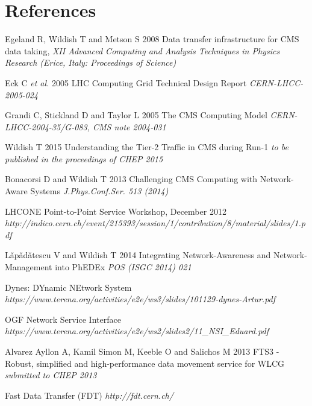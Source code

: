 \section*{References}

\begin{thebibliography}{1}

  Egeland R, Wildish T and Metson S 2008 Data transfer infrastructure for CMS data taking,  {\it XII Advanced Computing and Analysis Techniques in Physics Research (Erice, Italy: Proceedings of Science)}

 Eck C {\it et al.} 2005 LHC Computing Grid Technical Design Report {\it CERN-LHCC-2005-024}

  Grandi C, Stickland D and Taylor L 2005 The CMS Computing Model {\it CERN-LHCC-2004-35/G-083, CMS note 2004-031}

 Wildish T 2015 Understanding the Tier-2 Traffic in CMS during Run-1 {\it to be published in the proceedings of CHEP 2015}

 Bonacorsi D and Wildish T 2013 Challenging CMS Computing with Network-Aware Systems {\it J.Phys.Conf.Ser. 513 (2014)}

 LHCONE Point-to-Point Service Workshop, December 2012 
 {\it http://indico.cern.ch/event/215393/session/1/contribution/8/material/slides/1.pdf}

 L\v{a}p\v{a}d\v{a}tescu V and Wildish T 2014 Integrating Network-Awareness and Network-Management into PhEDEx {\it POS (ISGC 2014) 021}

 Dynes: DYnamic NEtwork System {\it https://www.terena.org/activities/e2e/ws3/slides/101129-dynes-Artur.pdf}


 OGF Network Service Interface {\it https://www.terena.org/activities/e2e/ws2/slides2/11\_NSI\_Eduard.pdf}

 Alvarez Ayllon A, Kamil Simon M, Keeble O and Salichos M 2013 FTS3 - Robust, simplified and high-performance data movement service for WLCG {\it submitted to CHEP 2013}

 Fast Data Transfer (FDT) {\it http://fdt.cern.ch/}

\end{thebibliography}